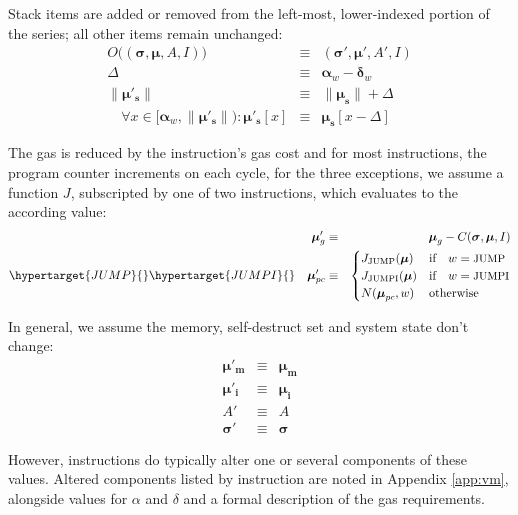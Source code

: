 \documentclass[9pt,oneside]{amsart}
\begin{document}
\begin{multicols}{2}
Stack items are added or removed from the left-most, lower-indexed portion of the series; all other items remain unchanged:
\begin{eqnarray}
O\big((\boldsymbol{\sigma}, \boldsymbol{\mu}, A, I)\big) & \equiv & (\boldsymbol{\sigma}', \boldsymbol{\mu}', A', I) \\
\Delta & \equiv & \mathbf{\alpha}_w - \mathbf{\delta}_w \\
\lVert\boldsymbol{\mu}'_\mathbf{s}\rVert & \equiv & \lVert\boldsymbol{\mu}_\mathbf{s}\rVert + \Delta \\
\quad \forall x \in [\mathbf{\alpha}_w, \lVert\boldsymbol{\mu}'_\mathbf{s}\rVert): \boldsymbol{\mu}'_\mathbf{s}[x] & \equiv & \boldsymbol{\mu}_\mathbf{s}[x-\Delta]
\end{eqnarray}

The gas is reduced by the instruction's gas cost and for most instructions, the program counter increments on each cycle, for the three exceptions, we assume a function $J$, subscripted by one of two instructions, which evaluates to the according value:
\begin{eqnarray}
\quad \boldsymbol{\mu}'_{g} & \equiv & \boldsymbol{\mu}_{g} - C(\boldsymbol{\sigma}, \boldsymbol{\mu}, I)  \\
\hypertarget{JUMP}{} \hypertarget{JUMPI}{} \label{eq:JUMP} \quad \boldsymbol{\mu}'_{pc} & \equiv & \begin{cases}
J_{\text{JUMP}}(\boldsymbol{\mu}) & \text{if} \quad w = \text{\small JUMP} \\
J_{\text{JUMPI}}(\boldsymbol{\mu}) & \text{if} \quad w = \text{\small JUMPI} \\
N(\boldsymbol{\mu}_{pc}, w) & \text{otherwise}
\end{cases}
\end{eqnarray}

In general, we assume the memory, self-destruct set and system state don't change:
\begin{eqnarray}
\boldsymbol{\mu}'_\mathbf{m} & \equiv & \boldsymbol{\mu}_\mathbf{m} \\
\boldsymbol{\mu}'_\mathbf{i} & \equiv & \boldsymbol{\mu}_\mathbf{i} \\
A' & \equiv & A \\
\boldsymbol{\sigma}' & \equiv & \boldsymbol{\sigma}
\end{eqnarray}

However, instructions do typically alter one or several components of these values. Altered components listed by instruction are noted in Appendix \ref{app:vm}, alongside values for $\alpha$ and $\delta$ and a formal description of the gas requirements.


\end{multicols}
\end{document}
